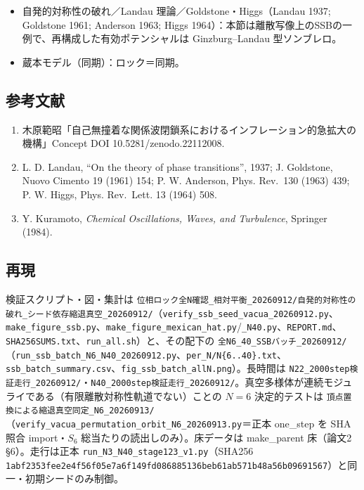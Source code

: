 \documentclass[
  a4paper,
]{ltjsarticle}
\providecommand{\tightlist}{%
  \setlength{\itemsep}{0pt}\setlength{\parskip}{0pt}}
\begin{document}
\begin{itemize}
\tightlist
\item
  自発的対称性の破れ／Landau 理論／Goldstone・Higgs（Landau 1937;
  Goldstone 1961; Anderson 1963; Higgs
  1964）：本節は離散写像上のSSBの一例で、再構成した有効ポテンシャルは
  Ginzburg--Landau 型ソンブレロ。
\item
  蔵本モデル（同期）：ロック＝同期。
\end{itemize}

\subsection{参考文献}\label{ux53c2ux8003ux6587ux732e}

\begin{enumerate}
\def\labelenumi{\arabic{enumi}.}
\tightlist
\item
  木原範昭「自己無撞着な関係波閉鎖系におけるインフレーション的急拡大の機構」Concept
  DOI 10.5281/zenodo.22112008.
\item
  L. D. Landau, ``On the theory of phase transitions'', 1937; J.
  Goldstone, Nuovo Cimento 19 (1961) 154; P. W. Anderson, Phys. Rev.~130
  (1963) 439; P. W. Higgs, Phys. Rev.~Lett. 13 (1964) 508.
\item
  Y. Kuramoto, \emph{Chemical Oscillations, Waves, and Turbulence},
  Springer (1984).
\end{enumerate}

\subsection{再現}\label{ux518dux73fe}

検証スクリプト・図・集計は
\texttt{位相ロック全N確認\_相対平衡\_20260912/自発的対称性の破れ\_シード依存縮退真空\_20260912/}（\texttt{verify\_ssb\_seed\_vacua\_20260912.py}、\texttt{make\_figure\_ssb.py}、\texttt{make\_figure\_mexican\_hat.py}/\texttt{\_N40.py}、\texttt{REPORT.md}、\texttt{SHA256SUMS.txt}、\texttt{run\_all.sh}）と、その配下の
\texttt{全N6\_40\_SSBバッチ\_20260912/}（\texttt{run\_ssb\_batch\_N6\_N40\_20260912.py}、\texttt{per\_N/N\{6..40\}.txt}、\texttt{ssb\_batch\_summary.csv}、\texttt{fig\_ssb\_batch\_allN.png}）。長時間は
\texttt{N22\_2000step検証走行\_20260912/}・\texttt{N40\_2000step検証走行\_20260912/}。真空多様体が連続モジュライである（有限離散対称性軌道でない）ことの
\(N=6\) 決定的テストは
\texttt{頂点置換による縮退真空同定\_N6\_20260913/}（\texttt{verify\_vacua\_permutation\_orbit\_N6\_20260913.py}＝正本
one\_step を SHA 照合 import・\(S_6\) 総当たりの読出しのみ）。床データは
make\_parent 床（論文2 §6）。走行は正本
\texttt{run\_N3\_N40\_stage123\_v1.py}（SHA256
\texttt{1abf2353fee2e4f56f05e7a6f149fd086885136beb61ab571b48a56b09691567}）と同一・初期シードのみ制御。
\end{document}
